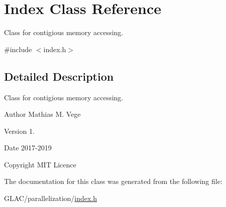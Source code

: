 \hypertarget{class_index}{}\section{Index Class Reference}
\label{class_index}


Class for contigious memory accessing.  




{\ttfamily \#include $<$index.\+h$>$}



\subsection{Detailed Description}
Class for contigious memory accessing. 

\begin{DoxyAuthor}{Author}
Mathias M. Vege 
\end{DoxyAuthor}
\begin{DoxyVersion}{Version}
1. 
\end{DoxyVersion}
\begin{DoxyDate}{Date}
2017-\/2019 
\end{DoxyDate}
\begin{DoxyCopyright}{Copyright}
M\+IT Licence 
\end{DoxyCopyright}


The documentation for this class was generated from the following file\+:\begin{DoxyCompactItemize}
\item 
G\+L\+A\+C/parallelization/\mbox{\hyperlink{index_8h}{index.\+h}}\end{DoxyCompactItemize}
